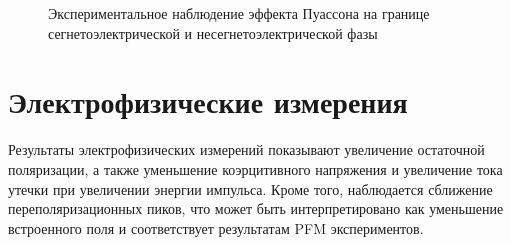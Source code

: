 \begin{figure}[ht]
    \caption[Этот текст попадает в названия рисунков в списке рисунков]{Экспериментальное наблюдение эффекта Пуассона на границе сегнетоэлектрической и несегнетоэлектрической фазы}\label{fig:pfm:lateral:calibration}
\end{figure}

\section{Электрофизические измерения}

Результаты электрофизических измерений показывают увеличение остаточной поляризации, а также уменьшение коэрцитивного напряжения и увеличение тока утечки при увеличении энергии импульса. Кроме того, наблюдается сближение переполяризационных пиков, что может быть интерпретировано как уменьшение встроенного поля и соответствует результатам PFM экспериментов.